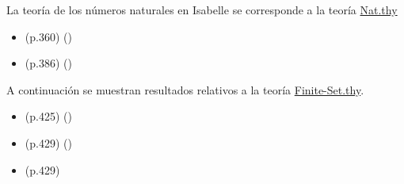 \begin{isabellebody}
\begin{isamarkuptext}
\begin{itemize}
  \end{itemize}%
\end{isamarkuptext}\isamarkuptrue%
%
\isadelimdocument
%
\endisadelimdocument
%
\isatagdocument
%
\isamarkuptrue%
%
\endisatagdocument
{\isafolddocument}%
%
\isadelimdocument
%
\endisadelimdocument
%
\begin{isamarkuptext}%
La teoría de los números naturales en Isabelle se corresponde a la teoría 
  \href{https://acortar.link/spxlz}{Nat.thy}%
\end{isamarkuptext}\isamarkuptrue%
%
\begin{isamarkuptext}%
\begin{itemize}
    \item (p.360)  
      \hfill ()
    \item (p.386)  
      \hfill ()
  \end{itemize}%
\end{isamarkuptext}\isamarkuptrue%
%
\isadelimdocument
%
\endisadelimdocument
%
\isatagdocument
%
\isamarkuptrue%
%
\endisatagdocument
{\isafolddocument}%
%
\isadelimdocument
%
\endisadelimdocument
%
\begin{isamarkuptext}%
A continuación se muestran resultados relativos a la teoría 
  \href{https://acortar.link/F6WFh}{Finite-Set.thy}.%
\end{isamarkuptext}\isamarkuptrue%
%
\begin{isamarkuptext}%
\begin{itemize}
    \item (p.425)  
      \hfill ()
    \item (p.429)  
      \hfill ()
    \item (p.429)  

\end{itemize}
\end{isamarkuptext}
\end{isabellebody}
